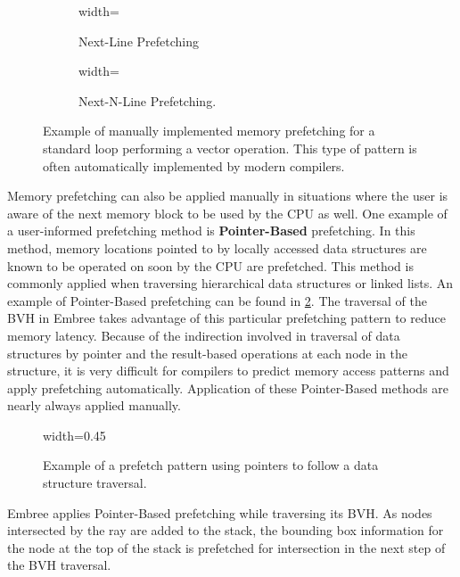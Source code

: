\begin{figure}[H]
  \begin{subfigure}[t]{0.48\textwidth}
    \centering
    {width=\textwidth}
    \caption{Next-Line Prefetching}
    \vfill
  \end{subfigure}
  \hfill
  \begin{subfigure}[t]{0.48\textwidth}
    \centering
    {width=\textwidth}
    \caption{Next-N-Line Prefetching.}
  \end{subfigure}
  \caption[Compiler memory prefetching examples.]{Example of manually implemented
    memory prefetching for a standard loop performing a vector operation. This
    type of pattern is often automatically implemented by modern compilers.}
  \label{fig:prefetch_examples}
\end{figure}

Memory prefetching can also be applied manually in situations where the user is
aware of the next memory block to be used by the CPU as well. One example of a
user-informed prefetching method is \textbf{Pointer-Based} prefetching. In this method,
memory locations pointed to by locally accessed data structures are known to be
operated on soon by the CPU are prefetched. This method is commonly applied when
traversing hierarchical data structures or linked lists. An example of
Pointer-Based prefetching can be found in \ref{fig:pointer_prefetching}. The
traversal of the BVH in Embree takes advantage of this particular prefetching
pattern to reduce memory latency. Because of the indirection involved in
traversal of data structures by pointer and the result-based operations at each
node in the structure, it is very difficult for compilers to predict memory
access patterns and apply prefetching automatically. Application of these
Pointer-Based methods are nearly always applied manually.

\begin{figure}[H]
\centering
{width=0.45\textwidth}
\caption[Manual memory prefetching example.]{Example of a prefetch pattern using
  pointers to follow a data structure traversal.}
\label{fig:pointer_prefetching}
\end{figure}

Embree applies Pointer-Based prefetching while traversing its BVH. As nodes
intersected by the ray are added to the stack, the bounding box
information for the node at the top of the stack is prefetched for intersection
in the next step of the BVH traversal.

